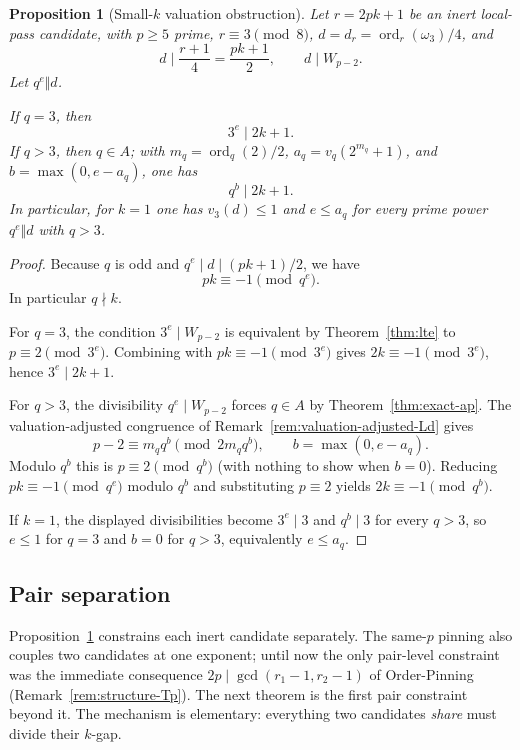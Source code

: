 \documentclass[11pt]{amsart}
\theoremstyle{plain}
\newtheorem{proposition}[theorem]{Proposition}
\theoremstyle{definition}
\theoremstyle{remark}
\numberwithin{equation}{section}
\newcommand{\ord}{\operatorname{ord}}
\begin{document}
\begin{proposition}[Small-$k$ valuation obstruction]\label{prop:small-k-valuation}
Let $r=2pk+1$ be an inert local-pass candidate, with $p\geq5$ prime, $r\equiv3\pmod8$, $d=d_r=\ord_r(\omega_3)/4$, and
\[
  d\mid \frac{r+1}{4}=\frac{pk+1}{2},
  \qquad
  d\mid W_{p-2}.
\]
Let $q^e\Vert d$.

If $q=3$, then
\[
  3^e\mid 2k+1.
\]
If $q>3$, then $q\in A$; with $m_q=\ord_q(2)/2$, $a_q=v_q(2^{m_q}+1)$, and $b=\max(0,e-a_q)$, one has
\[
  q^b\mid 2k+1.
\]
In particular, for $k=1$ one has $v_3(d)\leq1$ and $e\leq a_q$ for every prime power $q^e\Vert d$ with $q>3$.
\end{proposition}

\begin{proof}
Because $q$ is odd and $q^e\mid d\mid(pk+1)/2$, we have
\[
  pk\equiv -1 \pmod {q^e}.
\]
In particular $q\nmid k$.

For $q=3$, the condition $3^e\mid W_{p-2}$ is equivalent by Theorem~\ref{thm:lte} to $p\equiv2\pmod{3^e}$. Combining with $pk\equiv-1\pmod{3^e}$ gives $2k\equiv-1\pmod{3^e}$, hence $3^e\mid2k+1$.

For $q>3$, the divisibility $q^e\mid W_{p-2}$ forces $q\in A$ by Theorem~\ref{thm:exact-ap}. The valuation-adjusted congruence of Remark~\ref{rem:valuation-adjusted-Ld} gives
\[
  p-2\equiv m_q q^b \pmod {2m_q q^b},\qquad b=\max(0,e-a_q).
\]
Modulo $q^b$ this is $p\equiv2\pmod {q^b}$ (with nothing to show when $b=0$). Reducing $pk\equiv-1\pmod {q^e}$ modulo $q^b$ and substituting $p\equiv2$ yields $2k\equiv-1\pmod {q^b}$.

If $k=1$, the displayed divisibilities become $3^e\mid3$ and $q^b\mid3$ for every $q>3$, so $e\leq1$ for $q=3$ and $b=0$ for $q>3$, equivalently $e\leq a_q$.
\end{proof}

\subsection{Pair separation}\label{sec:pair-separation}

Proposition~\ref{prop:small-k-valuation} constrains each inert candidate separately. The same-$p$ pinning also couples two candidates at one exponent; until now the only pair-level constraint was the immediate consequence $2p \mid \gcd(r_1 - 1, r_2 - 1)$ of Order-Pinning (Remark~\ref{rem:structure-Tp}). The next theorem is the first pair constraint beyond it. The mechanism is elementary: everything two candidates \emph{share} must divide their $k$-gap.
\end{document}

